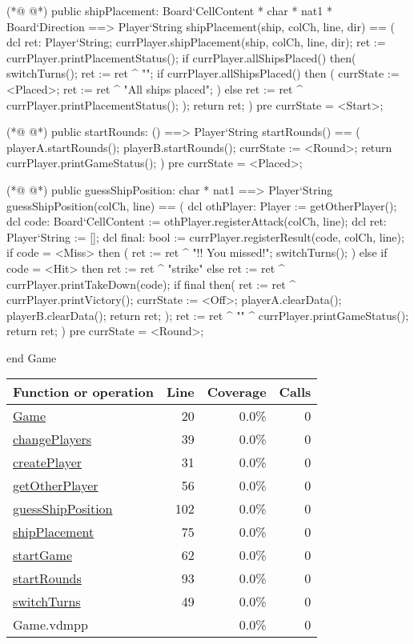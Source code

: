 \begin{vdmpp}[breaklines=true]
(*@
\label{shipPlacement:75}
@*)
 public shipPlacement: Board`CellContent * char * nat1 * Board`Direction ==> Player`String
  shipPlacement(ship, colCh, line, dir) == (
   dcl ret: Player`String;
   currPlayer.shipPlacement(ship, colCh, line, dir);
   ret := currPlayer.printPlacementStatus();
   if currPlayer.allShipsPlaced() then(
    switchTurns();
    ret := ret ^ "\n\n\n\n\n";
    if currPlayer.allShipsPlaced() then (
     currState := <Placed>;
     ret := ret ^ "All ships placed\n";
    )
   else ret := ret ^ currPlayer.printPlacementStatus();
   );
   return ret;
  )
  pre currState = <Start>;
  
(*@
\label{startRounds:93}
@*)
 public startRounds: () ==> Player`String
  startRounds() == (
   playerA.startRounds();
   playerB.startRounds();
   currState := <Round>;
   return currPlayer.printGameStatus();
  )
  pre currState = <Placed>;
  
(*@
\label{guessShipPosition:102}
@*)
 public guessShipPosition: char * nat1 ==> Player`String
  guessShipPosition(colCh, line) == (
   dcl othPlayer: Player := getOtherPlayer();
   dcl code: Board`CellContent := othPlayer.registerAttack(colCh, line);
   dcl ret: Player`String := [];
   dcl final: bool := currPlayer.registerResult(code, colCh, line);
   if code = <Miss> then (
    ret := ret ^ "\n\nSplash!! You missed!\n";
     switchTurns();
    )
   else if code = <Hit> then ret := ret ^ "\n\nGreat strike\n"
   else ret := ret ^ currPlayer.printTakeDown(code);
   if final then(
    ret := ret ^ currPlayer.printVictory();
    currState := <Off>;
    playerA.clearData();
    playerB.clearData();
    return ret;
   );
   ret := ret ^ "\n\n\n\n\n" ^ currPlayer.printGameStatus();
   return ret;
  )
  pre currState = <Round>;
    
end Game
\end{vdmpp}
\bigskip
\begin{longtable}{|l|r|r|r|}
\hline
Function or operation & Line & Coverage & Calls \\
\hline
\hline
\hyperref[Game:20]{Game} & 20&0.0\% & 0 \\
\hline
\hyperref[changePlayers:39]{changePlayers} & 39&0.0\% & 0 \\
\hline
\hyperref[createPlayer:31]{createPlayer} & 31&0.0\% & 0 \\
\hline
\hyperref[getOtherPlayer:56]{getOtherPlayer} & 56&0.0\% & 0 \\
\hline
\hyperref[guessShipPosition:102]{guessShipPosition} & 102&0.0\% & 0 \\
\hline
\hyperref[shipPlacement:75]{shipPlacement} & 75&0.0\% & 0 \\
\hline
\hyperref[startGame:62]{startGame} & 62&0.0\% & 0 \\
\hline
\hyperref[startRounds:93]{startRounds} & 93&0.0\% & 0 \\
\hline
\hyperref[switchTurns:49]{switchTurns} & 49&0.0\% & 0 \\
\hline
\hline
Game.vdmpp & & 0.0\% & 0 \\
\hline
\end{longtable}

